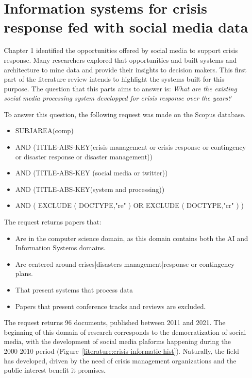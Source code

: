 \section{Information systems for crisis response fed with social media data}
Chapter 1 identified the opportunities offered by social media to support crisis response.
Many researchers explored that opportunities and built systems and architecture to mine data and provide their insights to decision makers.
This first part of the literature review intends to highlight the systems built for this purpose.
The question that this parts aims to answer is: \emph{What are the existing social media processing system developped for crisis response over the years?}

To answer this question, the following request was made on the Scopus database.
\begin{itemize}
    \item SUBJAREA(comp)
    \item AND (TITLE-ABS-KEY({crisis management} or {crisis response} or contingency or {disaster response} or {disaster management}))
    \item AND (TITLE-ABS-KEY ({social media} or twitter))
    \item AND (TITLE-ABS-KEY(system and processing))
    \item AND ( EXCLUDE ( DOCTYPE,"re" ) OR EXCLUDE ( DOCTYPE,"cr" ) )
\end{itemize}

The request returns papers that:
\begin{itemize}
    \item Are in the computer science domain, as this domain contains both the AI and Information Systems domains.
    \item Are centered around crises|disasters management|response or contingency plans.
    \item That present systems that process data
    \item Papers that present conference tracks and reviews are excluded.
\end{itemize}

The request returns 96 documents, published between 2011 and 2021.
The beginning of this domain of research corresponds to the democratization of social media, with the development of social media plaforms happening during the 2000-2010 period (Figure~\ref{literature:crisis-informatic-hist}).
Naturally, the field has developed, driven by the need of crisis management organizations and the public interest benefit it promises.

